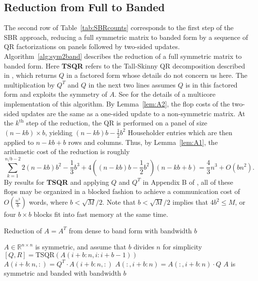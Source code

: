 \documentclass{article}
\def\lt{\left}
\def\rt{\right}
\theoremstyle{definition}
\begin{document}
\subsection{Reduction from Full to Banded}

The second row of Table~\ref{tab:SBRcounts} corresponds to the first step of the SBR approach, reducing a full symmetric matrix to banded form by a sequence of QR factorizations on panels followed by two-sided updates.  Algorithm~\ref{alg:sym2band} describes the reduction of a full symmetric matrix to banded form.  Here \textbf{TSQR} refers to the Tall-Skinny QR decomposition described in \cite{DGHL08}, which returns $Q$ in a factored form whose details do not concern us here. The multiplication by $Q^T$ and $Q$ in the next two lines assumes $Q$ is in this factored form and exploits the symmetry of $A$.  See \cite{LKDB10} for the details of a multicore implementation of this algorithm.  By Lemma~\ref{lem:A2}, the flop costs of the two-sided updates are the same as a one-sided update to a non-symmetric matrix.  At the $k^\text{th}$ step of the reduction, the QR is performed on a panel of size $(n-kb)\times b$, yielding $(n-kb)b-\frac12 b^2$ Householder entries which are then applied to $n-kb+b$ rows and columns.  Thus, by Lemma~\ref{lem:A1}, the arithmetic cost of the reduction is roughly
$$\sum_{k=1}^{n/b-2} 2(n-kb)b^2-\frac13 b^3 + 4 \lt((n-kb)b-\frac12 b^2\rt) (n-kb+b) = \frac43 n^3 + O(bn^2).$$
By results for \textbf{TSQR} and applying $Q$ and $Q^T$ in Appendix B of \cite{DGHL08}, all of these flops may be organized in a blocked fashion to achieve a communication cost of $O\lt(\frac{n^3}{b}\rt)$ words, where $b<\sqrt M / 2$.  Note that $b<\sqrt M / 2$ implies that $4b^2\leq M$, or four $b\times b$ blocks fit into fast memory at the same time.

\begin{algorithm}
\protect\caption{Reduction of $A=A^T$ from dense to band form with bandwidth $b$}
\label{alg:sym2band}
\begin{algorithmic}[1]
\REQUIRE $A\in\mathbb{R}^{n\times n}$ is symmetric, and assume that $b$ divides $n$ for simplicity
		\STATE $[Q,R] = \text{TSQR}(A(i+b:n,i:i+b-1))$
		\STATE $A(i+b:n,:) = Q^T \cdot A(i+b:n,:)$ 
		\STATE $A(:,i+b:n) = A(:,i+b:n) \cdot Q$ 
	\ENDFOR
\ENSURE $A$ is symmetric and banded with bandwidth $b$
\end{algorithmic}
\end{algorithm}
\end{document}
